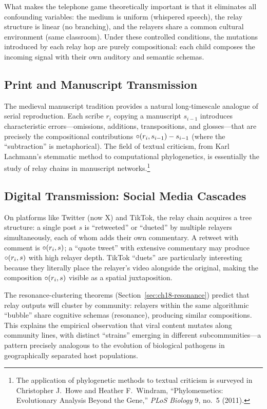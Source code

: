 What makes the telephone game theoretically important is that it
eliminates all confounding variables: the medium is uniform (whispered
speech), the relay structure is linear (no branching), and the relayers
share a common cultural environment (same classroom).  Under these
controlled conditions, the mutations introduced by each relay hop are
purely compositional: each child composes the incoming signal with their
own auditory and semantic schemas.

\subsection{Print and Manuscript Transmission}

The medieval manuscript tradition provides a natural long-timescale
analogue of serial reproduction.  Each scribe $r_i$ copying a manuscript
$s_{i-1}$ introduces characteristic errors---omissions, additions,
transpositions, and glosses---that are precisely the compositional
contributions $\circ(r_i, s_{i-1}) - s_{i-1}$ (where the ``subtraction''
is metaphorical).  The field of textual criticism, from Karl Lachmann's
stemmatic method to computational phylogenetics, is essentially the study
of relay chains in manuscript networks.\footnote{The application of
phylogenetic methods to textual criticism is surveyed in Christopher J.\
Howe and Heather F.\ Windram, ``Phylomemetics: Evolutionary Analysis
Beyond the Gene,'' \textit{PLoS Biology} 9, no.\ 5 (2011).}

\subsection{Digital Transmission: Social Media Cascades}

On platforms like Twitter (now X) and TikTok, the relay chain acquires
a tree structure: a single post $s$ is ``retweeted'' or ``dueted'' by
multiple relayers simultaneously, each of whom adds their own commentary.
A retweet with comment is $\circ(r_i, s)$; a ``quote tweet'' with
extensive commentary may produce $\circ(r_i, s)$ with high relayer
depth.  TikTok ``duets'' are particularly interesting because they
literally place the relayer's video alongside the original, making the
composition $\circ(r_i, s)$ visible as a spatial juxtaposition.

The resonance-clustering theorems
(Section~\ref{sec:ch18-resonance}) predict that relay outputs will cluster
by community: relayers within the same algorithmic ``bubble'' share
cognitive schemas (resonance), producing similar compositions.  This
explains the empirical observation that viral content mutates along
community lines, with distinct ``strains'' emerging in different
subcommunities---a pattern precisely analogous to the evolution of
biological pathogens in geographically separated host populations.

